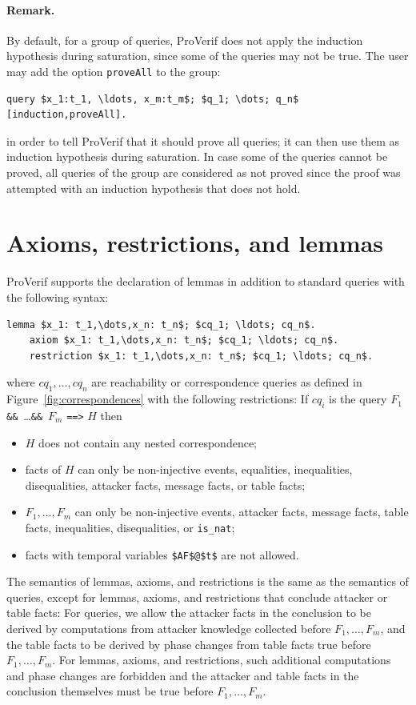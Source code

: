 \documentclass{book}
\begin{document}
\paragraph{Remark.} By default, for a group of queries, ProVerif does not apply the induction hypothesis during saturation, since some of the queries may not be true. The user may add the option \lstinline!proveAll! to the group:
\begin{lstlisting}[numbers=none]
query $x_1:t_1, \ldots, x_m:t_m$; $q_1; \dots; q_n$ [induction,proveAll].
\end{lstlisting}
in order to tell ProVerif that it should prove all queries; it can then use them as induction hypothesis during saturation. In case some of the queries cannot be proved, all queries of the group are considered as not proved since the proof was attempted with an induction hypothesis that does not hold.

\fussy

\section{Axioms, restrictions, and lemmas}\label{sec:lemmas}

ProVerif supports the declaration of lemmas in addition to standard queries with the following syntax:

\begin{lstlisting}[numbers=none]
	lemma $x_1: t_1,\dots,x_n: t_n$; $cq_1; \ldots; cq_n$.
	axiom $x_1: t_1,\dots,x_n: t_n$; $cq_1; \ldots; cq_n$.
	restriction $x_1: t_1,\dots,x_n: t_n$; $cq_1; \ldots; cq_n$.
\end{lstlisting}
where $cq_1, \ldots, cq_n$ are reachability or correspondence queries as defined in Figure~\ref{fig:correspondences} with the following restrictions: If $cq_i$ is the query $F_1$ \lstinline!&&!\ \ldots \lstinline!&&!\ $F_m$ \lstinline!==>! $H$ then
\begin{itemize}
	\item $H$ does not contain any nested correspondence;
	\item facts of $H$ can only be non-injective events, equalities, inequalities, disequalities, attacker facts, message facts, or table facts;%
	\item $F_1,\ldots, F_m$ can only be non-injective events, attacker facts, message facts, table facts, inequalities, disequalities, or \lstinline!is_nat!;
        \item facts with temporal variables \lstinline!$AF$@$t$! are not allowed.
\end{itemize}
The semantics of lemmas, axioms, and restrictions is the same as the semantics of queries, except for lemmas, axioms, and restrictions that conclude attacker or table facts: For queries, we allow the attacker facts in the conclusion to be derived by computations from attacker knowledge collected before $F_1, \dots, F_m$, and the table facts to be derived by phase changes from table facts true before $F_1, \dots, F_m$. For lemmas, axioms, and restrictions, such additional computations and phase changes are forbidden and the attacker and table facts in the conclusion themselves must be true before $F_1, \dots, F_m$.
\end{document}

